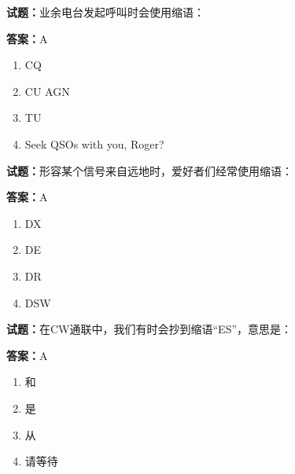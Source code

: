 \documentclass{ctexbook}
\begin{document}




\vspace{1em}

\textbf{试题：}业余电台发起呼叫时会使用缩语： 

\textbf{答案：}A 

\begin{enumerate}[leftmargin=3em]
  \item CQ 

  \item CU AGN 

  \item TU 

  \item Seek QSOs with you, Roger? 

\end{enumerate}





\vspace{1em}

\textbf{试题：}形容某个信号来自远地时，爱好者们经常使用缩语： 

\textbf{答案：}A 

\begin{enumerate}[leftmargin=3em]
  \item DX 

  \item DE 

  \item DR 

  \item DSW 

\end{enumerate}





\vspace{1em}

\textbf{试题：}在CW通联中，我们有时会抄到缩语“ES”，意思是： 

\textbf{答案：}A 


\begin{enumerate}[leftmargin=3em]
  \item 和 

  \item 是 

  \item 从 

  \item 请等待 

\end{enumerate}
\end{document}
